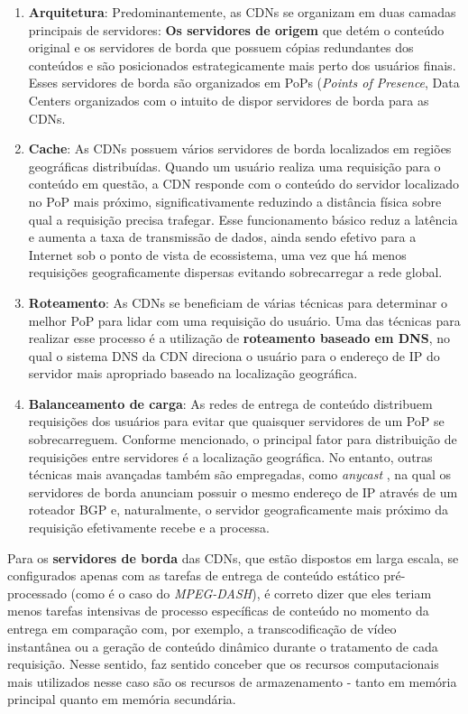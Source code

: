 \begin{enumerate}
    \item{\textbf{Arquitetura}}: Predominantemente, as CDNs se organizam em duas camadas principais de servidores: \textbf{Os servidores de origem} que detém o conteúdo original e os servidores de borda que possuem cópias redundantes dos conteúdos e são posicionados estrategicamente mais perto dos usuários finais. Esses servidores de borda são organizados em PoPs (\textit{Points of Presence}, Data Centers organizados com o intuito de dispor servidores de borda para as CDNs. 
    \item{\textbf{Cache}}: As CDNs possuem vários servidores de borda localizados em regiões geográficas distribuídas. Quando um usuário realiza uma requisição para o conteúdo em questão, a CDN responde com o conteúdo do servidor localizado no PoP mais próximo, significativamente reduzindo a distância física sobre qual a requisição precisa trafegar. Esse funcionamento básico reduz a latência e aumenta a taxa de transmissão de dados, ainda sendo efetivo para a Internet sob o ponto de vista de ecossistema, uma vez que há menos requisições geograficamente dispersas evitando sobrecarregar a rede global.
    \item{\textbf{Roteamento}}: As CDNs se beneficiam de várias técnicas para determinar o melhor PoP para lidar com uma requisição do usuário. Uma das técnicas para realizar esse processo é a utilização de \textbf{roteamento baseado em DNS}, no qual o sistema DNS da CDN direciona o usuário para o endereço de IP do servidor mais apropriado baseado na localização geográfica.
    \item{\textbf{Balanceamento de carga}}: As redes de entrega de conteúdo distribuem requisições dos usuários para evitar que quaisquer servidores de um PoP se sobrecarreguem. Conforme mencionado, o principal fator para distribuição de requisições entre servidores é a localização geográfica. No entanto, outras técnicas mais avançadas também são empregadas, como \textit{anycast} \cite{Preston2021Finding}, na qual os servidores de borda anunciam possuir o mesmo endereço de IP através de um roteador BGP e, naturalmente, o servidor geograficamente mais próximo da requisição efetivamente recebe e a processa.
\end{enumerate}

Para os \textbf{servidores de borda} das CDNs, que estão dispostos em larga escala, se configurados apenas com as tarefas de entrega de conteúdo estático pré-processado (como é o caso do \textit{MPEG-DASH}), é correto dizer que eles teriam menos tarefas intensivas de processo específicas de conteúdo no momento da entrega em comparação com, por exemplo, a transcodificação de vídeo instantânea ou a geração de conteúdo dinâmico durante o tratamento de cada requisição. Nesse sentido, faz sentido conceber que os recursos computacionais mais utilizados nesse caso são os recursos de armazenamento - tanto em memória principal quanto em memória secundária.

